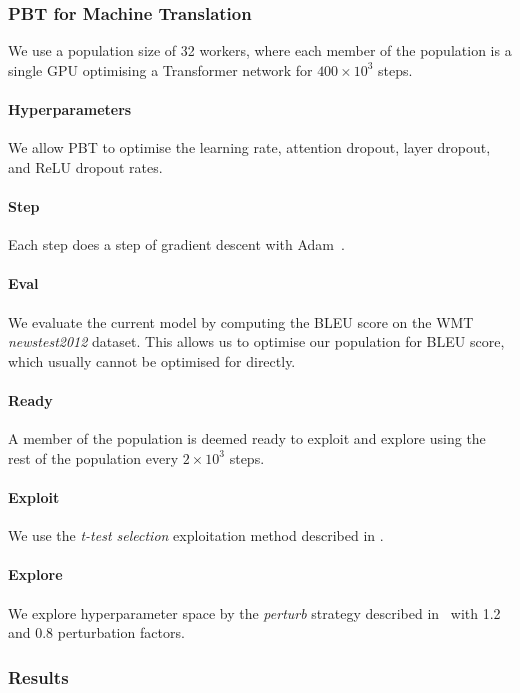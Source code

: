 \subsubsection{PBT for Machine Translation}
We use a population size of 32 workers, where each member of the population is a single GPU optimising a Transformer network for $400\times10^3$ steps. 
\vspace{-0.5em}\paragraph{Hyperparameters}We allow PBT to optimise the learning rate, attention dropout, layer dropout, and ReLU dropout rates. 
\vspace{-0.5em}\paragraph{Step}Each step does a step of gradient descent with Adam~\citep{adam}. 
\vspace{-0.5em}\paragraph{Eval}We evaluate the current model by computing the BLEU score on the WMT \textit{newstest2012} dataset. This allows us to optimise our population for BLEU score, which usually cannot be optimised for directly. 
\vspace{-0.5em}\paragraph{Ready}A member of the population is deemed ready to exploit and explore using the rest of the population every $2\times10^3$ steps. 
\vspace{-0.5em}\paragraph{Exploit}We use the \emph{t-test selection} exploitation method described in . \vspace{-0.5em}\paragraph{Explore}We explore hyperparameter space by the \emph{perturb} strategy described in~ with 1.2 and 0.8 perturbation factors.

\subsubsection{Results}

